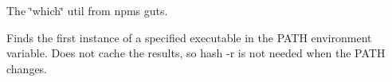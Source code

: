 The \char`\"{}which\char`\"{} util from npm\textquotesingle{}s guts.

Finds the first instance of a specified executable in the P\+A\+T\+H environment variable. Does not cache the results, so {\ttfamily hash -\/r} is not needed when the P\+A\+T\+H changes. 